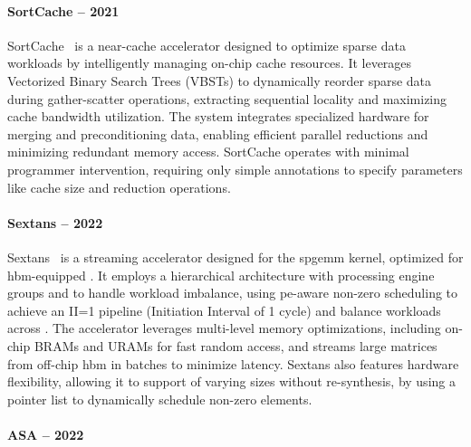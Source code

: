 \paragraph{SortCache -- 2021}

SortCache~\cite{Srikanth2021_SortCache} is a near-cache accelerator designed to optimize sparse data workloads by intelligently managing on-chip cache resources.
It leverages Vectorized Binary Search Trees (VBSTs) to dynamically reorder sparse data during \gls{gather}-\gls{scatter} operations, extracting sequential locality and maximizing cache bandwidth utilization.
The system integrates specialized hardware for merging and preconditioning data, enabling efficient parallel \glspl{reduction} and minimizing redundant memory access.
SortCache operates with minimal programmer intervention, requiring only simple annotations to specify parameters like cache size and \gls{reduction} operations.

\paragraph{Sextans -- 2022}

Sextans~\cite{Song2022_Sextans} is a streaming accelerator designed for the \acrshort{spgemm} kernel, optimized for \acrshort{hbm}-equipped .
It employs a hierarchical architecture with processing engine groups and  to handle workload imbalance, using \acrshort{pe}-aware non-zero scheduling to achieve an II=1 \gls{pipeline} (Initiation Interval of 1 cycle) and balance workloads across .
The accelerator leverages multi-level memory optimizations, including on-chip BRAMs and URAMs for fast random access, and streams large matrices from off-chip \acrshort{hbm} in batches to minimize latency.
Sextans also features hardware flexibility, allowing it to support  of varying sizes without re-synthesis, by using a pointer list to dynamically schedule non-zero elements.

\paragraph{ASA -- 2022}

